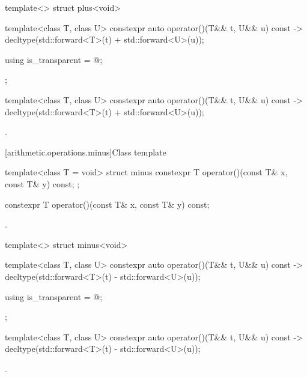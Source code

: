 %
\begin{itemdecl}
template<> struct plus<void> {
  template<class T, class U> constexpr auto operator()(T&& t, U&& u) const
    -> decltype(std::forward<T>(t) + std::forward<U>(u));

  using is_transparent = @\unspec@;
};
\end{itemdecl}

%
\begin{itemdecl}
template<class T, class U> constexpr auto operator()(T&& t, U&& u) const
    -> decltype(std::forward<T>(t) + std::forward<U>(u));
\end{itemdecl}

\begin{itemdescr}
\pnum
\returns
{}.
\end{itemdescr}

[arithmetic.operations.minus]{Class template }

%
\begin{itemdecl}
template<class T = void> struct minus {
  constexpr T operator()(const T& x, const T& y) const;
};
\end{itemdecl}

%
\begin{itemdecl}
constexpr T operator()(const T& x, const T& y) const;
\end{itemdecl}

\begin{itemdescr}
\pnum
\returns
{}.
\end{itemdescr}

%
\begin{itemdecl}
template<> struct minus<void> {
  template<class T, class U> constexpr auto operator()(T&& t, U&& u) const
    -> decltype(std::forward<T>(t) - std::forward<U>(u));

  using is_transparent = @\unspec@;
};
\end{itemdecl}

%
\begin{itemdecl}
template<class T, class U> constexpr auto operator()(T&& t, U&& u) const
    -> decltype(std::forward<T>(t) - std::forward<U>(u));
\end{itemdecl}

\begin{itemdescr}
\pnum
\returns
{}.
\end{itemdescr}

